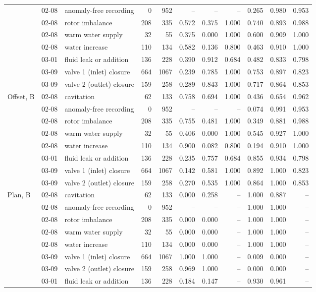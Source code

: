 \begin{tabular}{@{}l l l rr rrr rrr@{}}
 & 02-08 & anomaly-free recording & 0 & 952 & -- & -- & -- & 0.265 & 0.980 & 0.953 \\
 & 02-08 & rotor imbalance & 208 & 335 & 0.572 & 0.375 & 1.000 & 0.740 & 0.893 & 0.988 \\
 & 02-08 & warm water supply & 32 & 55 & 0.375 & 0.000 & 1.000 & 0.600 & 0.909 & 1.000 \\
 & 02-08 & water increase & 110 & 134 & 0.582 & 0.136 & 0.800 & 0.463 & 0.910 & 1.000 \\
 & 03-01 & fluid leak or addition & 136 & 228 & 0.390 & 0.912 & 0.684 & 0.482 & 0.833 & 0.798 \\
 & 03-09 & valve 1 (inlet) closure & 664 & 1067 & 0.239 & 0.785 & 1.000 & 0.753 & 0.897 & 0.823 \\
 & 03-09 & valve 2 (outlet) closure & 159 & 258 & 0.289 & 0.843 & 1.000 & 0.717 & 0.864 & 0.853 \\
Offset, B & 02-08 & cavitation & 62 & 133 & 0.758 & 0.694 & 1.000 & 0.436 & 0.654 & 0.962 \\
 & 02-08 & anomaly-free recording & 0 & 952 & -- & -- & -- & 0.074 & 0.991 & 0.953 \\
 & 02-08 & rotor imbalance & 208 & 335 & 0.755 & 0.481 & 1.000 & 0.349 & 0.881 & 0.988 \\
 & 02-08 & warm water supply & 32 & 55 & 0.406 & 0.000 & 1.000 & 0.545 & 0.927 & 1.000 \\
 & 02-08 & water increase & 110 & 134 & 0.900 & 0.082 & 0.800 & 0.194 & 0.910 & 1.000 \\
 & 03-01 & fluid leak or addition & 136 & 228 & 0.235 & 0.757 & 0.684 & 0.855 & 0.934 & 0.798 \\
 & 03-09 & valve 1 (inlet) closure & 664 & 1067 & 0.142 & 0.581 & 1.000 & 0.892 & 1.000 & 0.823 \\
 & 03-09 & valve 2 (outlet) closure & 159 & 258 & 0.270 & 0.535 & 1.000 & 0.864 & 1.000 & 0.853 \\
Plan, B & 02-08 & cavitation & 62 & 133 & 0.000 & 0.258 & -- & 1.000 & 0.887 & -- \\
 & 02-08 & anomaly-free recording & 0 & 952 & -- & -- & -- & 1.000 & 1.000 & -- \\
 & 02-08 & rotor imbalance & 208 & 335 & 0.000 & 0.000 & -- & 1.000 & 1.000 & -- \\
 & 02-08 & warm water supply & 32 & 55 & 0.000 & 0.000 & -- & 1.000 & 1.000 & -- \\
 & 02-08 & water increase & 110 & 134 & 0.000 & 0.000 & -- & 1.000 & 1.000 & -- \\
 & 03-09 & valve 1 (inlet) closure & 664 & 1067 & 1.000 & 1.000 & -- & 0.009 & 0.000 & -- \\
 & 03-09 & valve 2 (outlet) closure & 159 & 258 & 0.969 & 1.000 & -- & 0.000 & 0.000 & -- \\
 & 03-01 & fluid leak or addition & 136 & 228 & 0.184 & 0.147 & -- & 0.930 & 0.961 & -- \\
\bottomrule
\end{tabular}
